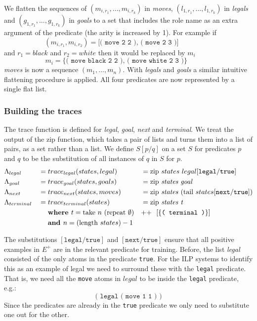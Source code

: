 We flatten the sequences of $(m_{i,r_1},...,m_{i,r_k})$ in \textit{moves}, $(l_{1,r_1},...,l_{1,r_k})$ in \textit{legals} and $(g_{1,r_1},...,g_{1,r_k})$ in \textit{goals} to a set that includes the role name as an extra argument of the predicate (the arity is increased by 1). For example if
\[(m_{i,r_1},m_{i,r_2}) = \texttt{[( move 2 2 ), ( move 2 3 )]}\ \ \ \ \ \ \ \ \ \ \ \ \ \ \ \ \ \ \ \ \ \ \]
and $r_1 = black$ and $r_2 = white$ then it would be replaced by $m_i$
\[m_i = \texttt{\{( move black 2 2 ), ( move white 2 3 )\}}\ \ \ \ \ \ \ \ \ \ \ \ \ \ \ \ \]
\textit{moves} is now a sequence $(m_1,...,m_n)$. With \textit{legals} and \textit{goals} a similar intuitive flattening procedure is applied. All four predicates are now represented by a single flat list.
\subsubsection{Building the traces}
The trace function is defined for \textit{legal}, \textit{goal}, \textit{next} and \textit{terminal}. We treat the output of the zip function, which takes a pair of lists and turns them into a list of pairs, as a set rather than a list. We define $S[p/q]$ on a set $S$ for predicates $p$ and $q$ to be the substitution of all instances of $q$ in $S$ for $p$.
\begin{align*}
&\Lambda_{legal} &&= trace_{legal}(states,legal) &&= \text{zip } states\ legal[\texttt{legal}/\texttt{true}] \\
&\Lambda_{goal} &&= trace_{goal}(states,goals) &&= \text{zip \textit{states goal}} \\
&\Lambda_{next} &&= trace_{next}(states,moves) &&= \text{zip \textit{states} } \text{(tail }states[\texttt{next}/\texttt{true}]) \\
&\Lambda_{terminal} &&= trace_{terminal}(states) &&= \text{zip \textit{states t}} \\
&&&\ \ \ \ \textbf{where  } t =\text{take } n\ (\text{repeat } \emptyset ) &&\text{++}\ \ [\{\texttt{( terminal )}\}] \\
&&&\ \ \ \ \textbf{and } n = (\text{length }states) - 1 &&
\end{align*}

The substitutions $[\texttt{legal}/\texttt{true}]$ and $[\texttt{next}/\texttt{true}]$ ensure that all positive examples in $E^+$ are in the relevant predicate for training. Before, the list \textit{legal} consisted of the only atoms in the predicate \texttt{true}. For the ILP systems to identify this as an example of legal we need to surround these with the \texttt{legal} predicate. That is, we need all the \texttt{move} atoms in $legal$ to be inside the \texttt{legal} predicate, e.g.:
\[\texttt{( legal ( move 1 1 ) )}\]
Since the predicates are already in the \texttt{true} predicate we only need to substitute one out for the other.


